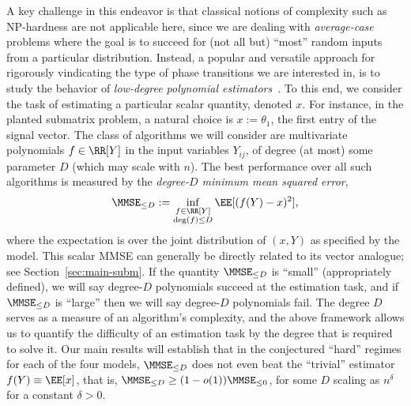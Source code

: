 \documentclass[11pt]{article}
\begin{document}
A key challenge in this endeavor is that classical notions of complexity such as NP-hardness are not applicable here, since we are dealing with \emph{average-case} problems where the goal is to succeed for (not all but) ``most'' random inputs from a particular distribution. Instead, a popular and versatile approach for rigorously vindicating the type of phase transitions we are interested in, is to study the behavior of \emph{low-degree polynomial estimators}~\cite{SW-estimation}. To this end, we consider the task of estimating a particular scalar quantity, denoted $x$. For instance, in the planted submatrix problem, a natural choice is $x := \theta_1$, the first entry of the signal vector. The class of algorithms we will consider are multivariate polynomials $f \in \RR[Y]$ in the input variables $Y_{ij}$, of degree (at most) some parameter $D$ (which may scale with $n$). The best performance over all such algorithms is measured by the \emph{degree-$D$ minimum mean squared error},
\begin{equation}\label{eq:def:mmse}
\MMSE_{\le D} := \inf_{\substack{f \in \RR[Y] \\ \deg(f) \le D}} \EE[(f(Y)-x)^2],
\end{equation}
where the expectation is over the joint distribution of $(x,Y)$ as specified by the model. This scalar MMSE can generally be directly related to its vector analogue; see Section~\ref{sec:main-subm}. If the quantity $\MMSE_{\le D}$ is ``small'' (appropriately defined), we will say degree-$D$ polynomials succeed at the estimation task, and if $\MMSE_{\le D}$ is ``large'' then we will say degree-$D$ polynomials fail. The degree $D$ serves as a measure of an algorithm's complexity, and the above framework allows us to quantify the difficulty of an estimation task by the degree that is required to solve it. Our main results will establish that in the conjectured ``hard'' regimes for each of the four models, $\MMSE_{\leq D}$ does not even beat the ``trivial'' estimator $f(Y) \equiv \EE[x]$, that is, $\MMSE_{\leq D}\geq (1-o(1))\MMSE_{\leq 0}$, for some $D$ scaling as $n^\delta$ for a constant $\delta > 0$.
\end{document}
